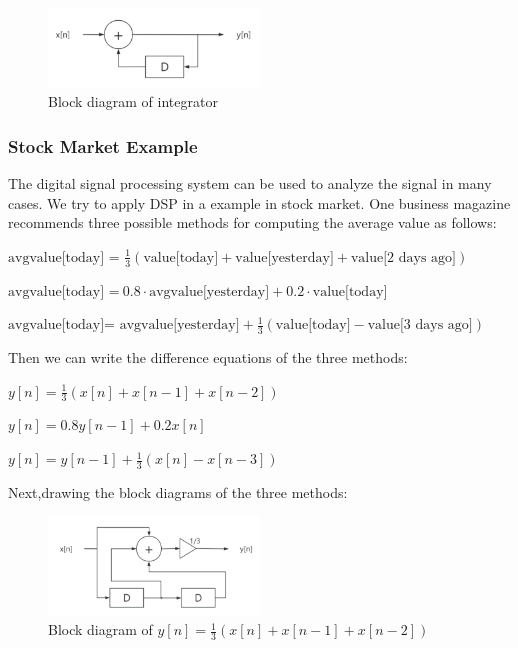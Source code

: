 \documentclass[journal]{IEEEtran}
\begin{document}
 \begin{figure}[H]
   \centering
   \includegraphics[width=0.5\textwidth]{integ.png} %
   \caption{Block diagram of integrator }
   \label{fig:integ}
 \end{figure}


\subsubsection{Stock Market Example}
The digital signal processing system can be used to analyze the signal in many cases. 
We try to apply DSP in a example in stock market.
One business magazine recommends three possible methods for computing the average value as follows:


\vspace{\baselineskip}
$\text{avgvalue[today]}$ = $\frac{1}{3} ( \text{value[today]} + \text{value[yesterday]} + \text{value[2 days ago]} ) $

\vspace{\baselineskip}
$\text{avgvalue[today]}$ =$ ~0.8 \cdot \text{avgvalue[yesterday]} + 0.2 \cdot \text{value[today]} $

\vspace{\baselineskip}
$\text{avgvalue[today]} $= $\text{avgvalue[yesterday]} + \frac{1}{3} (\text{value[today]} - \text{value[3 days ago]})$

\vspace{\baselineskip}
Then we can write the difference equations of the three methods:
 
\vspace{\baselineskip}
$y[n] = \frac{1}{3}(x[n]+x[n-1]+x[n-2])$ 
\vspace{\baselineskip}

$y[n] = 0.8y[n-1]+0.2x[n]$ 
\vspace{\baselineskip}

$y[n] = y[n-1]+\frac{1}{3}(x[n]-x[n-3])$

\vspace{\baselineskip}
Next,drawing the block diagrams of the three methods:
\begin{figure}[H]
   \centering
   \includegraphics[width=0.5\textwidth]{2.2.1.png} %
   \caption{Block diagram of $y[n] = \frac{1}{3}(x[n]+x[n-1]+x[n-2])$  }
   \label{fig:2.2.1}
\end{figure}
\end{document}
